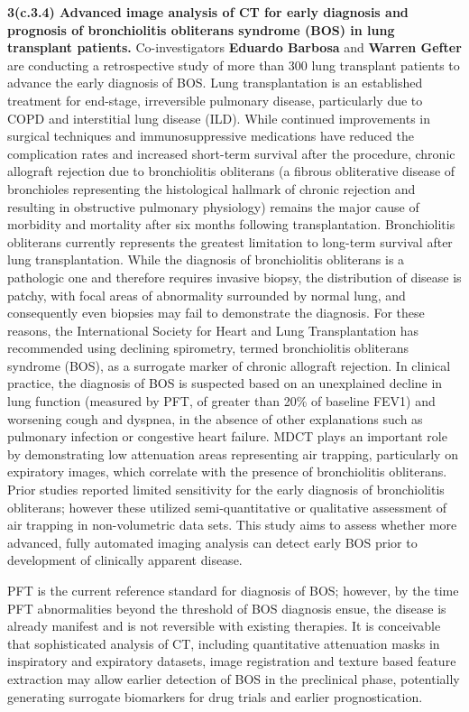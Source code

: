 \documentclass[11pt,]{article}
\begin{document}
\textbf{3(c.3.4) Advanced image analysis of CT for early diagnosis and
prognosis of bronchiolitis obliterans syndrome (BOS) in lung transplant
patients.} Co-investigators \textbf{Eduardo Barbosa} and \textbf{Warren
Gefter} are conducting a retrospective study of more than 300 lung
transplant patients to advance the early diagnosis of BOS. Lung
transplantation is an established treatment for end-stage, irreversible
pulmonary disease, particularly due to COPD and interstitial lung
disease (ILD). While continued improvements in surgical techniques and
immunosuppressive medications have reduced the complication rates and
increased short-term survival after the procedure, chronic allograft
rejection due to bronchiolitis obliterans (a fibrous obliterative
disease of bronchioles representing the histological hallmark of chronic
rejection and resulting in obstructive pulmonary physiology) remains the
major cause of morbidity and mortality after six months following
transplantation. Bronchiolitis obliterans currently represents the
greatest limitation to long-term survival after lung transplantation.
While the diagnosis of bronchiolitis obliterans is a pathologic one and
therefore requires invasive biopsy, the distribution of disease is
patchy, with focal areas of abnormality surrounded by normal lung, and
consequently even biopsies may fail to demonstrate the diagnosis. For
these reasons, the International Society for Heart and Lung
Transplantation has recommended using declining spirometry, termed
bronchiolitis obliterans syndrome (BOS), as a surrogate marker of
chronic allograft rejection. In clinical practice, the diagnosis of BOS
is suspected based on an unexplained decline in lung function (measured
by PFT, of greater than 20\% of baseline FEV1) and worsening cough and
dyspnea, in the absence of other explanations such as pulmonary
infection or congestive heart failure. MDCT plays an important role by
demonstrating low attenuation areas representing air trapping,
particularly on expiratory images, which correlate with the presence of
bronchiolitis obliterans. Prior studies reported limited sensitivity for
the early diagnosis of bronchiolitis obliterans; however these utilized
semi-quantitative or qualitative assessment of air trapping in
non-volumetric data sets. This study aims to assess whether more
advanced, fully automated imaging analysis can detect early BOS prior to
development of clinically apparent disease.

PFT is the current reference standard for diagnosis of BOS; however, by
the time PFT abnormalities beyond the threshold of BOS diagnosis ensue,
the disease is already manifest and is not reversible with existing
therapies. It is conceivable that sophisticated analysis of CT,
including quantitative attenuation masks in inspiratory and expiratory
datasets, image registration and texture based feature extraction may
allow earlier detection of BOS in the preclinical phase, potentially
generating surrogate biomarkers for drug trials and earlier
prognostication.
\end{document}

